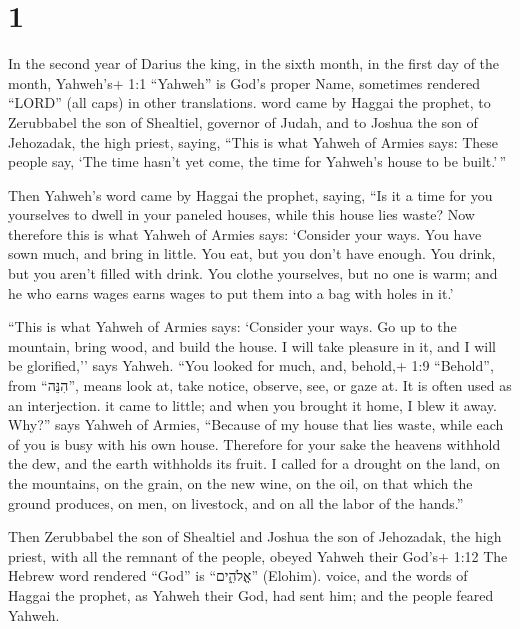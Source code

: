 \hypertarget{section}{%
\section{1}\label{section}}

 In the second year of Darius the king, in the sixth month,
in the first day of the month, Yahweh's+ 1:1 ``Yahweh'' is God's proper
Name, sometimes rendered ``LORD'' (all caps) in other translations. word
came by Haggai the prophet, to Zerubbabel the son of Shealtiel, governor
of Judah, and to Joshua the son of Jehozadak, the high priest, saying,
 ``This is what Yahweh of Armies says: These people say,
`The time hasn't yet come, the time for Yahweh's house to be built.'\,''

 Then Yahweh's word came by Haggai the prophet, saying,
 ``Is it a time for you yourselves to dwell in your paneled
houses, while this house lies waste?  Now therefore this is
what Yahweh of Armies says: `Consider your ways.  You have
sown much, and bring in little. You eat, but you don't have enough. You
drink, but you aren't filled with drink. You clothe yourselves, but no
one is warm; and he who earns wages earns wages to put them into a bag
with holes in it.'

 ``This is what Yahweh of Armies says: `Consider your ways.
 Go up to the mountain, bring wood, and build the house. I
will take pleasure in it, and I will be glorified,'' says Yahweh.
 ``You looked for much, and, behold,+ 1:9 ``Behold'', from
``הִנֵּה'', means look at, take notice, observe, see, or gaze at. It is
often used as an interjection. it came to little; and when you brought
it home, I blew it away. Why?'' says Yahweh of Armies, ``Because of my
house that lies waste, while each of you is busy with his own house.
 Therefore for your sake the heavens withhold the dew, and
the earth withholds its fruit.  I called for a drought on
the land, on the mountains, on the grain, on the new wine, on the oil,
on that which the ground produces, on men, on livestock, and on all the
labor of the hands.''

 Then Zerubbabel the son of Shealtiel and Joshua the son of
Jehozadak, the high priest, with all the remnant of the people, obeyed
Yahweh their God's+ 1:12 The Hebrew word rendered ``God'' is
``אֱלֹהִ֑ים'' (Elohim). voice, and the words of Haggai the prophet, as
Yahweh their God, had sent him; and the people feared Yahweh.

